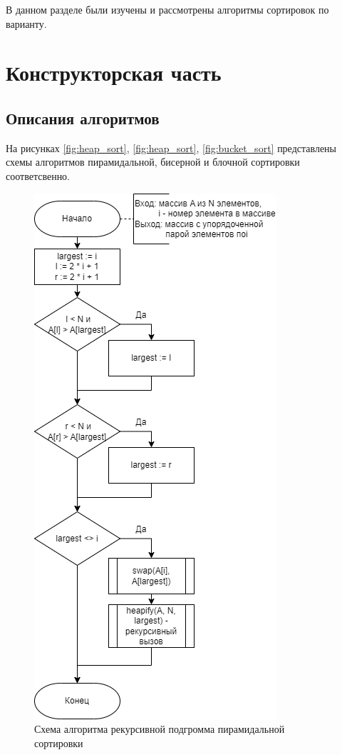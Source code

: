 \documentclass[a4paper,14pt, unknownkeysallowed]{extreport}
\begin{document}
В данном разделе были изучены и рассмотрены алгоритмы сортировок по варианту.
	
\chapter{Конструкторская часть}

\section{Описания алгоритмов}
	
На рисунках \ref{fig:heap_sort}, \ref{fig:heap_sort}, \ref{fig:bucket_sort} представлены схемы алгоритмов пирамидальной, бисерной и блочной сортировки соответсвенно.

\begin{figure}[h!]
	\centering
	\includegraphics[width=0.52\linewidth]{img/heapify.png}
	\caption{Схема алгоритма рекурсивной  подгромма пирамидальной сортировки}
	\label{fig:heapify}
\end{figure}
	
\end{document}
